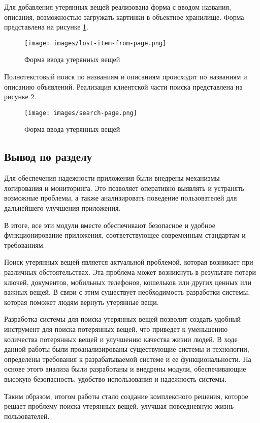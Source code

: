Для добавления утерянных вещей реализована форма с вводом названия, описания, возможностью загружать картинки в объектное хранилище. Форма представлена на рисунке \ref{fig:lost-item-from-page}.

\begin{figure}[htb]
	\centering
	\texttt{[image: images/lost-item-from-page.png]}
	\parskip=6pt
	\caption{Форма ввода утерянных вещей}
	\label{fig:lost-item-from-page}
\end{figure}

Полнотекстовый поиск по названиям и описаниям происходит по названиям и описанию объявлений. Реализация клиентской части поиска представлена на рисунке \ref{fig:search-page}.

\begin{figure}[htb]
	\centering
	\texttt{[image: images/search-page.png]}
	\parskip=6pt
	\caption{Форма ввода утерянных вещей}
	\label{fig:search-page}
\end{figure}

\subsection*{Вывод по разделу}

Для обеспечения надежности приложения были внедрены механизмы логирования и мониторинга. Это позволяет оперативно выявлять и устранять возможные проблемы, а также анализировать поведение пользователей для дальнейшего улучшения приложения.

В итоге, все эти модули вместе обеспечивают безопасное и удобное функционирование приложения, соответствующее современным стандартам и требованиям.

Поиск утерянных вещей является актуальной проблемой, которая возникает при различных обстоятельствах. Эта проблема может возникнуть в результате потери ключей, документов, мобильных телефонов, кошельков или других ценных или важных вещей. В связи с этим существует необходимость разработки системы, которая поможет людям вернуть утерянные вещи.

Разработка системы для поиска утерянных вещей позволит создать удобный инструмент для поиска потерянных вещей, что приведет к уменьшению количества потерянных вещей и улучшению качества жизни людей. В ходе данной работы были проанализированы существующие системы и технологии, определены требования к разрабатываемой системе и ее функциональности. На основе этого анализа были разработаны и внедрены модули, обеспечивающие высокую безопасность, удобство использования и надежность системы.

Таким образом, итогом работы стало создание комплексного решения, которое решает проблему поиска утерянных вещей, улучшая повседневную жизнь пользователей.